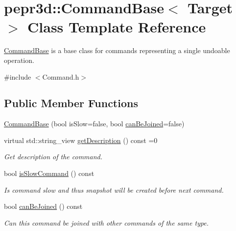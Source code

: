 \hypertarget{classpepr3d_1_1_command_base}{}\section{pepr3d\+::Command\+Base$<$ Target $>$ Class Template Reference}
\label{classpepr3d_1_1_command_base}


\mbox{\hyperlink{classpepr3d_1_1_command_base}{Command\+Base}} is a base class for commands representing a single undoable operation.  




{\ttfamily \#include $<$Command.\+h$>$}

\subsection*{Public Member Functions}
\begin{DoxyCompactItemize}
\item 
\mbox{\hyperlink{classpepr3d_1_1_command_base_aa4644cac610c68ac671fbf04af61186f}{Command\+Base}} (bool is\+Slow=false, bool \mbox{\hyperlink{classpepr3d_1_1_command_base_aead9aa5e9149a485497805aa1a4527bf}{can\+Be\+Joined}}=false)
\item 
\mbox{\label{classpepr3d_1_1_command_base_a0b01d47e5d418d3c2e0aba612c88f42b}} 
virtual std\+::string\+\_\+view \mbox{\hyperlink{classpepr3d_1_1_command_base_a0b01d47e5d418d3c2e0aba612c88f42b}{get\+Description}} () const =0
\begin{DoxyCompactList}\small\item\em Get description of the command. \end{DoxyCompactList}\item 
\mbox{\label{classpepr3d_1_1_command_base_a861152ab2c31b4257cf99e351da91418}} 
bool \mbox{\hyperlink{classpepr3d_1_1_command_base_a861152ab2c31b4257cf99e351da91418}{is\+Slow\+Command}} () const
\begin{DoxyCompactList}\small\item\em Is command slow and thus snapshot will be created before next command. \end{DoxyCompactList}\item 
\mbox{\label{classpepr3d_1_1_command_base_aead9aa5e9149a485497805aa1a4527bf}} 
bool \mbox{\hyperlink{classpepr3d_1_1_command_base_aead9aa5e9149a485497805aa1a4527bf}{can\+Be\+Joined}} () const
\begin{DoxyCompactList}\small\item\em Can this command be joined with other commands of the same type. \end{DoxyCompactList}\end{DoxyCompactItemize}
